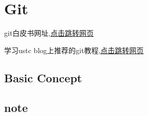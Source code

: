 \chapter{Git}
git白皮书网址,\href{https://git-scm.com/book/en/v2}{点击跳转网页}

学习ustc blog上推荐的git教程,\href{https://liaoxuefeng.com/books/git/introduction/index.html}{点击跳转网页}


\section{Basic Concept}

\section{note}